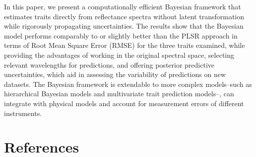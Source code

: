 \documentclass[
  letterpaper,
  DIV=11,
  numbers=noendperiod]{scrartcl}
\begin{document}
In this paper, we present a computationally efficient Bayesian framework
that estimates traits directly from reflectance spectra without latent
transformation while rigorously propagating uncertainties. The results
show that the Bayesian model performs comparably to or slightly better
than the PLSR approach in terms of Root Mean Square Error (RMSE) for the
three traits examined, while providing the advantages of working in the
original spectral space, selecting relevant wavelengths for predictions,
and offering posterior predictive uncertainties, which aid in assessing
the variability of predictions on new datasets. The Bayesian framework
is extendable to more complex models--such as hierarchical Bayesian
models and multivariate trait prediction models--, can integrate with
physical models and account for measurement errors of different
instruments.

\hypertarget{references}{%
\section*{References}\label{references}}
\end{document}
